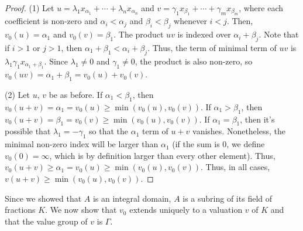 \begin{proof}
(1) Let $u = \lambda_1 x_{\alpha_1} + \cdots + \lambda_n x_{\alpha_n}$ and $v = \gamma_1 x_{\beta_1} + \cdots + \gamma_m x_{\beta_m}$, where each coefficient
is non-zero and $\alpha_i < \alpha_j$ and $\beta_i < \beta_j$ whenever $i < j$. Then, $v_0(u) = \alpha_1$ and $v_0(v) = \beta_1$. The product $uv$ is indexed
over $\alpha_i + \beta_j$. Note that if $i > 1$ or $j > 1$, then $\alpha_1 + \beta_1 < \alpha_i + \beta_j$. Thus, the term of minimal term of $uv$ is 
$\lambda_1 \gamma_1 x_{\alpha_1 + \beta_1}$. Since $\lambda_1 \neq 0$ and $\gamma_1 \neq 0$, the product is also non-zero, so 
$v_0(uv) = \alpha_1 + \beta_1 = v_0(u) + v_0(v)$.

(2) Let $u$, $v$ be as before. If $\alpha_1 < \beta_1$, then $v_0(u + v) = \alpha_1 = v_0(u) \ge \min(v_0(u),v_0(v))$. If $\alpha_1 > \beta_1$, then
$v_0(u + v) = \beta_1 = v_0(v) \ge \min(v_0(u),v_0(v))$. If $\alpha_1 = \beta_1$, then it's possible that $\lambda_1 = -\gamma_1$ so that the $\alpha_1$ 
term of $u+v$ vanishes. Nonetheless, the minimal non-zero index will be larger than $\alpha_1$ (if the sum is $0$, we define $v_0(0) = \infty$, which is
by definition larger than every other element). Thus, $v_0(u + v) \ge \alpha_1 = v_0(u) \ge \min(v_0(u),v_0(v))$. Thus, in all cases, 
$v(u + v) \ge \min(v_0(u),v_0(v))$.
\end{proof}

Since we showed that $A$ is an integral domain, $A$ is a subring of its field of fractions $K$. We now show that $v_0$ extends uniquely to a valuation 
$v$ of $K$ and that the value group of $v$ is $\Gamma$.

